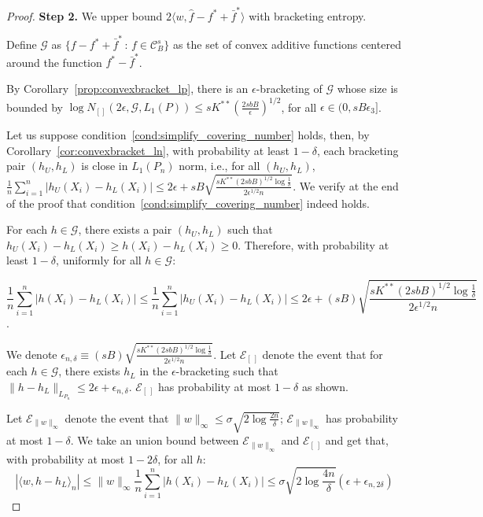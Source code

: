 \begin{proof}

\textbf{Step 2.} We upper bound $2 \langle w, \hat{f} - f^* + \bar{f}^* \rangle$ with bracketing entropy.

Define $\mathcal{G}$ as $\{ f - f^* + \bar{f}^* \,:\, f \in \mathcal{C}^s_B \}$ as the set of convex additive functions centered around the function $f^* - \bar{f}^*$. 

By Corollary~\ref{prop:convexbracket_lp}, there is an $\epsilon$-bracketing of $\mathcal{G}$ whose size is bounded by $\log N_{[]}( 2\epsilon, \mathcal{G}, L_1(P)) \leq sK^{**} \left( \frac{2sbB}{\epsilon} \right)^{1/2}$, for all $\epsilon \in (0, sB \epsilon_3]$.

Let us suppose condition~\ref{cond:simplify_covering_number} holds, then, by Corollary~\ref{cor:convexbracket_ln}, with probability at least $1-\delta$, each bracketing pair $(h_U, h_L)$ is close in $L_1(P_n)$ norm, i.e., for all $(h_U, h_L)$, 
$\frac{1}{n} \sum_{i=1}^n | h_U(X_i) - h_L(X_i) | \leq 2 \epsilon + sB \sqrt{ \frac{sK^{**}(2sbB
)^{1/2} \log \frac{1}{\delta}}{2\epsilon^{1/2} n}}$. We verify at the end of the proof that condition~\ref{cond:simplify_covering_number} indeed holds.


For each $h \in \mathcal{G}$, there exists a pair $(h_U, h_L)$ such that $h_U(X_i) - h_L(X_i) \geq h(X_i) - h_L(X_i) \geq 0$. Therefore, with probability at least $1-\delta$, uniformly for all $h \in \mathcal{G}$:

$$
\frac{1}{n} \sum_{i=1}^n |h(X_i) - h_L(X_i)| \leq \frac{1}{n} \sum_{i=1}^n | h_U(X_i) - h_L(X_i)| \leq 2\epsilon +  (sB) \sqrt{ \frac{sK^{**}(2sbB)^{1/2} \log \frac{1}{\delta}}{2\epsilon^{1/2} n}}
$$.

We denote $\epsilon_{n,\delta} \equiv (sB) \sqrt{ \frac{sK^{**}(2sbB)^{1/2} \log \frac{1}{\delta}}{2\epsilon^{1/2} n}}$. Let $\mathcal{E}_{[\,]}$ denote the event that for each $h \in \mathcal{G}$, there exists $h_L$ in the $\epsilon$-bracketing such that $\|h-h_L\|_{L_{P_n}} \leq 2\epsilon + \epsilon_{n, \delta}$. $\mathcal{E}_{[\,]}$ has probability at most $1-\delta$ as shown.

Let $\mathcal{E}_{\|w\|_\infty}$ denote the event that $\| w \|_\infty \leq \sigma \sqrt{ 2\log \frac{2n}{\delta}}$; $\mathcal{E}_{\|w\|_\infty}$ has probability at most $1-\delta$. We take an union bound between $\mathcal{E}_{\|w\|_\infty}$ and $\mathcal{E}_{[\,]}$ and get that, with probability at most $1-2\delta$, for all $h$:
\[
|\langle w, h - h_L\rangle_n| \leq \| w \|_\infty \frac{1}{n} \sum_{i=1}^n |h(X_i) - h_L(X_i)| \leq
  \sigma \sqrt{2 \log \frac{4n}{\delta}} \left( \epsilon + \epsilon_{n,2\delta} \right)
\]



\end{proof}
